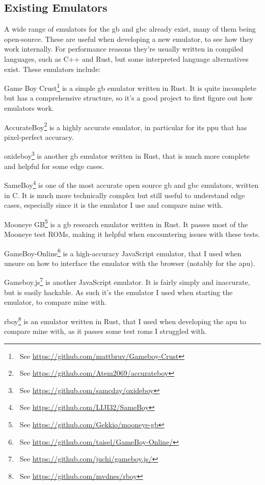 \documentclass[11pt]{report}
\newcommand{\ftnt}[1]{\footnote{~See \url{#1}}}
\begin{document}
\subsection{Existing Emulators}

A wide range of emulators for the \gls{gb} and \gls{gbc} already exist, many of them being open-source. These are useful when developing a new emulator, to see how they work internally. For performance reasons they're usually written in compiled languages, such as C++ and Rust, but some interpreted language alternatives exist. These emulators include:

\begin{compactitem}
    \item Game Boy Crust\ftnt{https://github.com/mattbruv/Gameboy-Crust} is a simple \gls{gb} emulator written in Rust. It is quite incomplete but has a comprehensive structure, so it's a good project to first figure out how emulators work.
    \item AccurateBoy\ftnt{https://github.com/Atem2069/accurateboy} is a highly accurate emulator, in particular for its \gls{ppu} that has pixel-perfect accuracy.
    \item oxideboy\ftnt{https://github.com/samcday/oxideboy} is another \gls{gb} emulator written in Rust, that is much more complete and helpful for some edge cases.
    \item SameBoy\ftnt{https://github.com/LIJI32/SameBoy} is one of the most accurate open source \gls{gb} and \gls{gbc} emulators, written in C. It is much more technically complex but still useful to understand edge cases, especially since it is the emulator I use and compare mine with.
    \item Mooneye GB\ftnt{https://github.com/Gekkio/mooneye-gb} is a \gls{gb} research emulator written in Rust. It passes most of the Mooneye test ROMs, making it helpful when encountering issues with these tests.
    \item GameBoy-Online\ftnt{https://github.com/taisel/GameBoy-Online/} is a high-accuracy JavaScript emulator, that I used when unsure on how to interface the emulator with the browser (notably for the \gls{apu}).
    \item Gameboy.js\ftnt{https://github.com/juchi/gameboy.js/} is another JavaScript emulator. It is fairly simply and inaccurate, but is easily hackable. As such it's the emulator I used when starting the emulator, to compare mine with.
    \item rboy\ftnt{https://github.com/mvdnes/rboy} is an emulator written in Rust, that I used when developing the \gls{apu} to compare mine with, as it passes some test \glspl{rom} I struggled with.
\end{compactitem}
\end{document}
